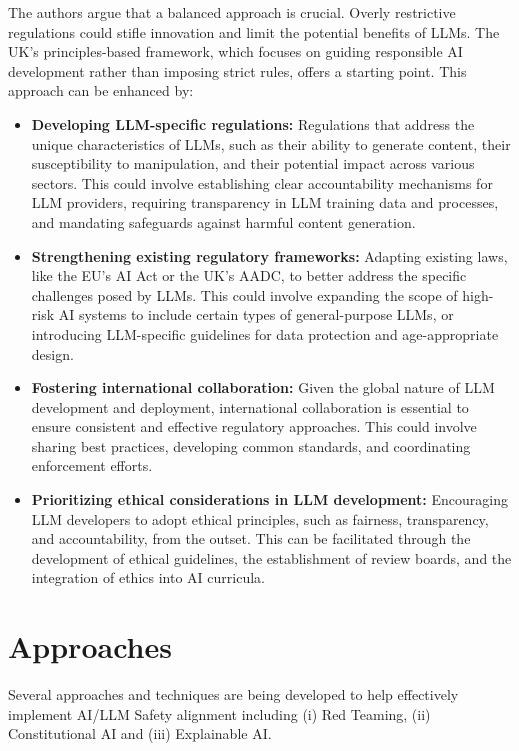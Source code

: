 The authors argue that a balanced approach is crucial. Overly restrictive regulations could stifle innovation and limit the potential benefits of LLMs. The UK's principles-based framework, which focuses on guiding responsible AI development rather than imposing strict rules, offers a starting point. This approach can be enhanced by:

\begin{itemize}
    \item \textbf{Developing LLM-specific regulations:} Regulations that address the unique characteristics of LLMs, such as their ability to generate content, their susceptibility to manipulation, and their potential impact across various sectors. This could involve establishing clear accountability mechanisms for LLM providers, requiring transparency in LLM training data and processes, and mandating safeguards against harmful content generation.
    
    \item \textbf{Strengthening existing regulatory frameworks:} Adapting existing laws, like the EU's AI Act or the UK's AADC, to better address the specific challenges posed by LLMs. This could involve expanding the scope of high-risk AI systems to include certain types of general-purpose LLMs, or introducing LLM-specific guidelines for data protection and age-appropriate design.
    
    \item \textbf{Fostering international collaboration:} Given the global nature of LLM development and deployment, international collaboration is essential to ensure consistent and effective regulatory approaches. This could involve sharing best practices, developing common standards, and coordinating enforcement efforts.
    
    \item \textbf{Prioritizing ethical considerations in LLM development:} Encouraging LLM developers to adopt ethical principles, such as fairness, transparency, and accountability, from the outset. This can be facilitated through the development of ethical guidelines, the establishment of review boards, and the integration of ethics into AI curricula.
\end{itemize}

\section{Approaches}

Several approaches and techniques are being developed to help effectively implement AI/LLM Safety alignment including (i) Red Teaming, (ii) Constitutional AI and (iii) Explainable AI.

